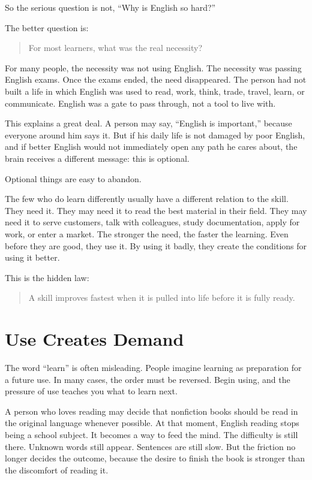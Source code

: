 So the serious question is not, ``Why is English so hard?''

The better question is:

\begin{quote}
For most learners, what was the real necessity?
\end{quote}

For many people, the necessity was not using English. The necessity was passing English exams. Once the exams ended, the need disappeared. The person had not built a life in which English was used to read, work, think, trade, travel, learn, or communicate. English was a gate to pass through, not a tool to live with.

This explains a great deal. A person may say, ``English is important,'' because everyone around him says it. But if his daily life is not damaged by poor English, and if better English would not immediately open any path he cares about, the brain receives a different message: this is optional.

Optional things are easy to abandon.

The few who do learn differently usually have a different relation to the skill. They need it. They may need it to read the best material in their field. They may need it to serve customers, talk with colleagues, study documentation, apply for work, or enter a market. The stronger the need, the faster the learning. Even before they are good, they use it. By using it badly, they create the conditions for using it better.

This is the hidden law:

\begin{quote}
A skill improves fastest when it is pulled into life before it is fully ready.
\end{quote}

\section*{Use Creates Demand}

The word ``learn'' is often misleading. People imagine learning as preparation for a future use. In many cases, the order must be reversed. Begin using, and the pressure of use teaches you what to learn next.

A person who loves reading may decide that nonfiction books should be read in the original language whenever possible. At that moment, English reading stops being a school subject. It becomes a way to feed the mind. The difficulty is still there. Unknown words still appear. Sentences are still slow. But the friction no longer decides the outcome, because the desire to finish the book is stronger than the discomfort of reading it.

